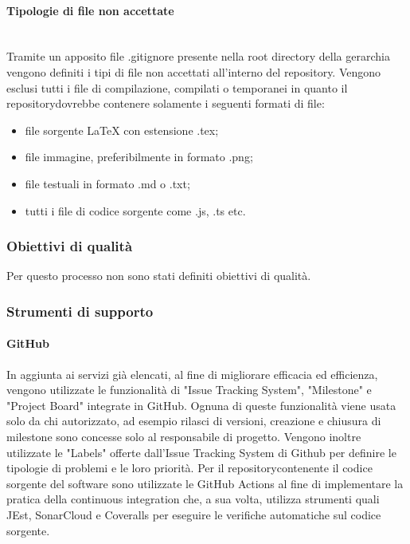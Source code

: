 	\paragraph{Tipologie di file non accettate}\mbox{}\\ [1mm]
		Tramite un apposito file .gitignore presente nella root directory della gerarchia vengono definiti i tipi di file non accettati all'interno del repository\glo. Vengono esclusi tutti i file di compilazione, compilati o temporanei in quanto il repository\glosp dovrebbe contenere solamente i seguenti formati di file:
		\begin{itemize}
			\item file sorgente \LaTeX \xspace con estensione .tex;
			\item file immagine, preferibilmente in formato .png;
			\item file testuali in formato .md o .txt;
			\item tutti i file di codice sorgente come .js, .ts etc.		
		\end{itemize}
	\subsubsection{Obiettivi di qualità}
	Per questo processo non sono stati definiti obiettivi di qualità.
	\subsubsection{Strumenti di supporto}
		\paragraph{GitHub}
			In aggiunta ai servizi già elencati, al fine di migliorare efficacia ed efficienza, vengono utilizzate le funzionalità di "Issue Tracking System",  
			"Milestone" e "Project Board" integrate in GitHub. Ognuna di queste funzionalità viene usata solo da chi autorizzato, ad esempio rilasci di versioni, creazione e chiusura di milestone sono concesse solo al responsabile di progetto\glo.
			\newline
			Vengono inoltre utilizzate le "Labels" offerte dall'Issue Tracking System di Github per definire le tipologie di problemi e le loro priorità.
			\newline
			Per il repository\glosp contenente il codice sorgente del software sono utilizzate le GitHub Actions al fine di implementare la pratica della continuous integration che, a sua volta, utilizza strumenti quali JEst, SonarCloud e Coveralls per eseguire le verifiche automatiche sul codice sorgente.
